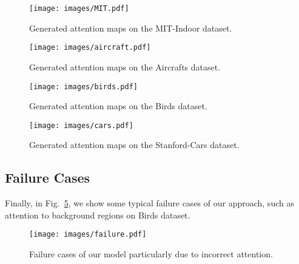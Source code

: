 \documentclass{bmvc2k}
\begin{document}
\begin{figure}[!ht]
	\centering
	\texttt{[image: images/MIT.pdf]}
	\vspace{0.2in}
	
	\caption{\label{fig:arch} Generated attention maps on the MIT-Indoor dataset.}
\end{figure}\newpage\begin{figure}[!ht]
	\centering
	\texttt{[image: images/aircraft.pdf]}
	\vspace{0.2in}
	
	\caption{\label{fig:Air} Generated attention maps on the Aircrafts dataset.}
\end{figure}\newpage\begin{figure}[!ht]
	\centering
	\texttt{[image: images/birds.pdf]}
	\vspace{0.2in}
	
	\caption{\label{fig:Birds} Generated attention maps on the Birds dataset.}
	\vspace{-0.1in}
\end{figure}\newpage\begin{figure}[!ht]
	\centering
	\texttt{[image: images/cars.pdf]}
	\vspace{0.2in}
	
	\caption{\label{fig:SCars} Generated attention maps on the Stanford-Cars dataset.}
	\vspace{-0.1in}
\end{figure}\newpage\newpage\subsection{Failure Cases}
Finally, in Fig.~\ref{fig:failure}, we show some typical failure cases of our approach, such as attention to background regions on Birds dataset.

\begin{figure}[!ht]
	\centering
	\texttt{[image: images/failure.pdf]}
	\vspace{0.2in}
	
	\caption{\label{fig:failure} Failure cases of our model particularly due to incorrect attention.}
	\vspace{-0.1in}
\end{figure}
\end{document}
